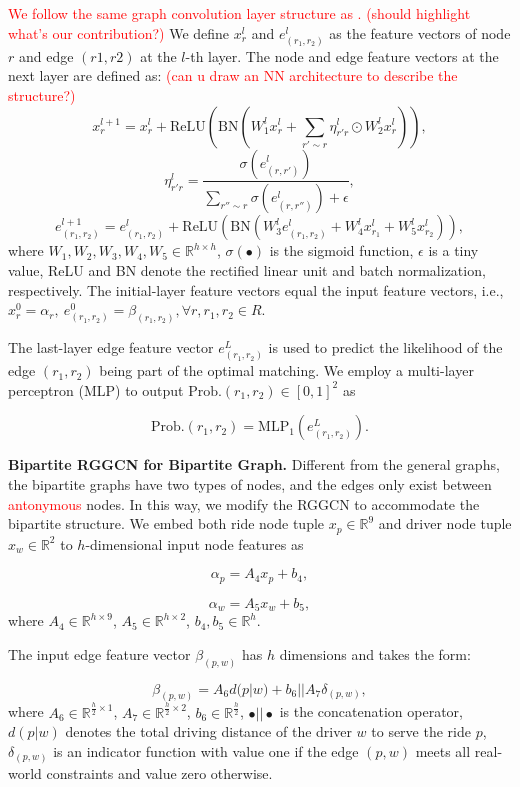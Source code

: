 \documentclass[sigconf]{acmart}
\newcommand{\tcr}[1]{{\textcolor{red}{#1}}}
\begin{document}
\tcr{We follow the same graph convolution layer structure as \cite{joshi2019efficient}. (should highlight what's our contribution?)}
We define $x_{r}^{l}$ and $e_{(r_{1},r_{2})}^{l}$ as the feature
vectors of node $r$ and edge $(r1,r2)$ at the $l$-th layer. The
node and edge feature vectors at the next layer are defined as: 
\tcr{(can u draw an NN architecture to describe the structure?)}
\[
x_{r}^{l+1}=x_{r}^{l}+\text{ReLU}(\text{BN}(W_{1}^{l}x_{r}^{l}+\sum_{r'\sim r}\eta_{r'r}^{l}\odot W_{2}^{l}x_{r}^{l})),
\]
\[
\eta_{r'r}^{l}=\frac{\sigma(e_{(r,r')}^{l})}{\sum_{r''\sim r}\sigma(e_{(r,r'')}^{l})+\epsilon},
\]
\[
e_{(r_{1},r_{2})}^{l+1}=e_{(r_{1},r_{2})}^{l}+\text{ReLU}(\text{BN}(W_{3}^{l}e_{(r_{1},r_{2})}^{l}+W_{4}^{l}x_{r_{1}}^{l}+W_{5}^{l}x_{r_{2}}^{l})),
\]
where $W_{1},W_{2},W_{3},W_{4},W_{5}\in\mathbb{R}^{h\times h}$, $\sigma(\bullet)$
is the sigmoid function, $\epsilon$ is a tiny value, ReLU and BN
denote the rectified linear unit and batch normalization, respectively.
The initial-layer feature vectors equal the input feature vectors,
i.e., $x_{r}^{0}=\alpha_{r},\ e_{(r_{1},r_{2})}^{0}=\beta_{(r_{1},r_{2})},\forall r,r_{1},r_{2}\in R$.

The last-layer edge feature vector $e_{(r_{1},r_{2})}^{L}$ is used
to predict the likelihood of the edge $(r_{1},r_{2})$ being part
of the optimal matching. We employ a multi-layer perceptron (MLP)
to output $\text{Prob.}(r_{1},r_{2})\in[0,1]^{2}$ as

\[
\text{Prob.}(r_{1},r_{2})=\text{MLP}_{1}(e_{(r_{1},r_{2})}^{L}).
\]

\textbf{Bipartite RGGCN for Bipartite Graph.} Different from the general
graphs, the bipartite graphs have two types of nodes, and the edges
only exist between \tcr{antonymous} nodes. In this way, we modify the RGGCN
to accommodate the bipartite structure. We embed both ride node tuple
$x_{p}\in\mathbb{R}^{9}$ and driver node tuple $x_{w}\in\mathbb{R}^{2}$
to $h$-dimensional input node features as 

\[
\alpha_{p}=A_{4}x_{p}+b_{4},
\]

\[
\alpha_{w}=A_{5}x_{w}+b_{5},
\]
where $A_{4}\in\mathbb{R}^{h\times9}$, $A_{5}\in\mathbb{R}^{h\times2}$,
$b_{4},b_{5}\in\mathbb{R}^{h}$.

The input edge feature vector $\beta_{(p,w)}$ has $h$ dimensions
and takes the form:

\[
\beta_{(p,w)}=A_{6}d(p|w)+b_{6}||A_{7}\delta_{(p,w)},
\]
 where $A_{6}\in\mathbb{R}^{\frac{h}{2}\times1}$, $A_{7}\in\mathbb{R}^{\frac{h}{2}\times2}$,
$b_{6}\in\mathbb{R}^{\frac{h}{2}}$, $\bullet||\bullet$ is the concatenation
operator, $d(p|w)$ denotes the total driving distance of the driver
$w$ to serve the ride $p$, $\delta_{\left(p,w\right)}$ is an indicator
function with value one if the edge $(p,w)$ meets all real-world
constraints and value zero otherwise. 
\end{document}
